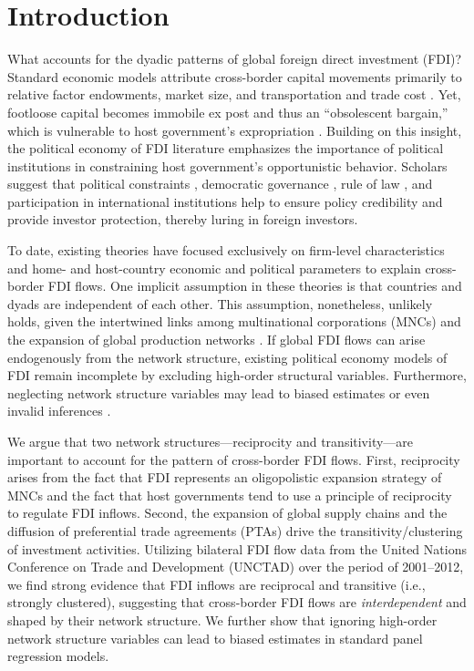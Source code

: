 \documentclass[reqno,onecolumn,letterpaper,12pt]{article}
\begin{document}
\clearpage
\doublespacing
\setcounter{page}{1}
\section{Introduction}


What accounts for the dyadic patterns of global foreign direct investment (FDI)? Standard economic models attribute cross-border capital movements primarily to relative factor endowments, market size, and transportation and trade cost \citep[see,~e.g.,][]{Helpman:1984,Carr_et_al:2001}. Yet, footloose capital becomes immobile ex post and thus an ``obsolescent bargain,'' which is vulnerable to host government's expropriation \citep{Vernon:1971,Vernon:1980}. Building on this insight, the political economy of FDI literature emphasizes the importance of political institutions in constraining host government's opportunistic behavior. Scholars suggest that political constraints \citep{Henisz:2000}, democratic governance \citep{Jensen:2003,Jensen:2006}, rule of law \citep{Li_Resnick:2003,Staats_Biglaiser:2012}, and participation in international institutions \citep{Buthe_Milner:2008,Allee_Peinhardt:2011} help to ensure policy credibility and provide investor protection, thereby luring in foreign investors.

To date, existing theories have focused exclusively on firm-level characteristics and home- and host-country economic and political parameters to explain cross-border FDI flows. One implicit assumption in these theories is that countries and dyads are independent of each other. This assumption, nonetheless, unlikely holds, given the intertwined links among multinational corporations (MNCs) and the expansion of global production networks \citep{UNCTAD:2013}. If global FDI flows can arise endogenously from the network structure, existing political economy models of FDI remain incomplete by excluding high-order structural variables. Furthermore, neglecting network structure variables may lead to biased estimates or even invalid inferences \citep{cranmer2011inferential}.

We argue that two network structures---reciprocity and transitivity---are important to account for the pattern of cross-border FDI flows. First, reciprocity arises from the fact that FDI represents an oligopolistic expansion strategy of MNCs and the fact that host governments tend to use a principle of reciprocity to regulate FDI inflows. Second, the expansion of global supply chains and the diffusion of preferential trade agreements (PTAs) drive the transitivity/clustering of investment activities. Utilizing bilateral FDI flow data from the United Nations Conference on Trade and Development (UNCTAD) over the period of 2001--2012, we find strong evidence that FDI inflows are reciprocal and transitive (i.e., strongly clustered), suggesting that cross-border FDI flows are \textit{interdependent} and shaped by their network structure. We further show that ignoring high-order network structure variables can lead to biased estimates in standard panel regression models.
\end{document}

